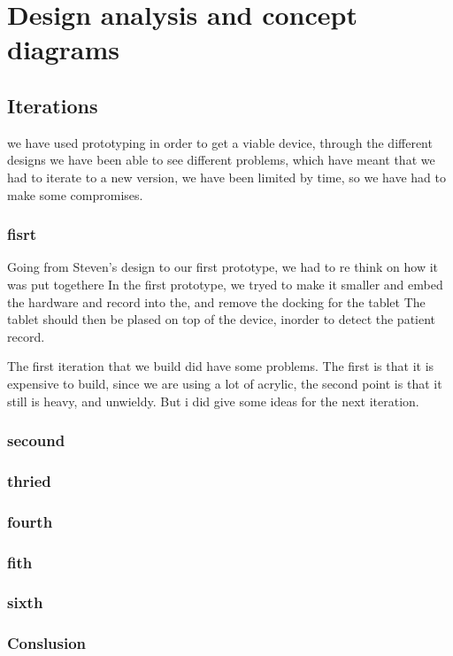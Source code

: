 \section{Design analysis and concept diagrams}

\subsection{Iterations}
we have used prototyping in order to get a viable device, through the different designs we have been able to see different problems, which have meant that we had to iterate to a new version, we have been limited by time, so we have had to make some compromises.

\subsubsection{fisrt}
Going from Steven's design to our first prototype, we had to re think on how it was put togethere 
In the first prototype, we tryed to make it smaller and embed the hardware and record into the, and remove the docking for the tablet
The tablet should then be plased on top of the device, inorder to detect the patient record.


The first iteration that we build did have some problems.
The first is that it is expensive to build, since we are using a lot of acrylic, the second point is that it still is heavy, and unwieldy.
But i did give some ideas for the next iteration.

\subsubsection{secound}


\subsubsection{thried}


\subsubsection{fourth}


\subsubsection{fith}

\subsubsection{sixth}

\subsubsection{Conslusion}